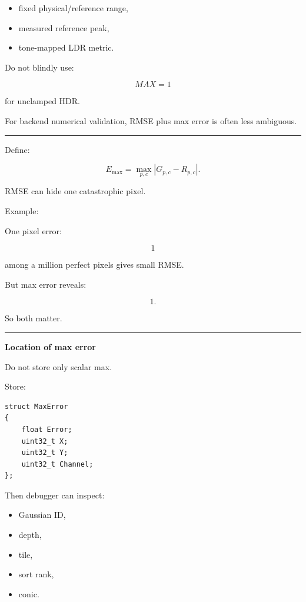 \begin{itemize}
\tightlist
\item
  fixed physical/reference range,
\item
  measured reference peak,
\item
  tone-mapped LDR metric.
\end{itemize}

Do not blindly use:

\[
MAX=1
\]

for unclamped HDR.

For backend numerical validation, RMSE plus max error is often less ambiguous.

\begin{center}\rule{0.5\linewidth}{0.5pt}\end{center}

Define:

\[
\boxed{
E_{\max}
=
\max_{p,c}
|G_{p,c}-R_{p,c}|.
}
\]

RMSE can hide one catastrophic pixel.

Example:

One pixel error:

\[
1
\]

among a million perfect pixels gives small RMSE.

But max error reveals:

\[
1.
\]

So both matter.

\begin{center}\rule{0.5\linewidth}{0.5pt}\end{center}

\textbf{Location of max error}

Do not store only scalar max.

Store:

\protect{}\label{vgsyyh}%
\begin{verbatim}
struct MaxError
{
    float Error;
    uint32_t X;
    uint32_t Y;
    uint32_t Channel;
};
\end{verbatim}

Then debugger can inspect:

\begin{itemize}
\tightlist
\item
  Gaussian ID,
\item
  depth,
\item
  tile,
\item
  sort rank,
\item
  conic.
\end{itemize}

